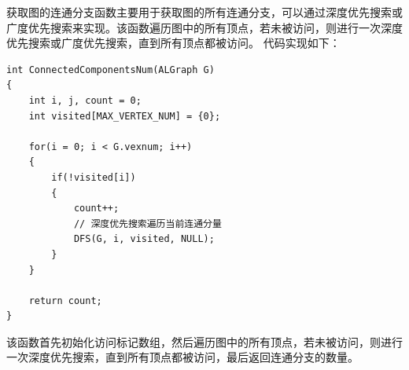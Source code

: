 \documentclass[supercite]{Experimental_Report}
\theoremstyle{definition}
\begin{document}
	获取图的连通分支函数主要用于获取图的所有连通分支，可以通过深度优先搜索或广度优先搜索来实现。该函数遍历图中的所有顶点，若未被访问，则进行一次深度优先搜索或广度优先搜索，直到所有顶点都被访问。
	代码实现如下：
\begin{lstlisting}[caption={图的连通分支}, label=lst:connected_components]
	int ConnectedComponentsNum(ALGraph G)
{
    int i, j, count = 0;
    int visited[MAX_VERTEX_NUM] = {0};

    for(i = 0; i < G.vexnum; i++)
    {
        if(!visited[i])
        {
            count++;
            // 深度优先搜索遍历当前连通分量
            DFS(G, i, visited, NULL);
        }
    }

    return count;
}
\end{lstlisting}
	该函数首先初始化访问标记数组，然后遍历图中的所有顶点，若未被访问，则进行一次深度优先搜索，直到所有顶点都被访问，最后返回连通分支的数量。
\end{document}
